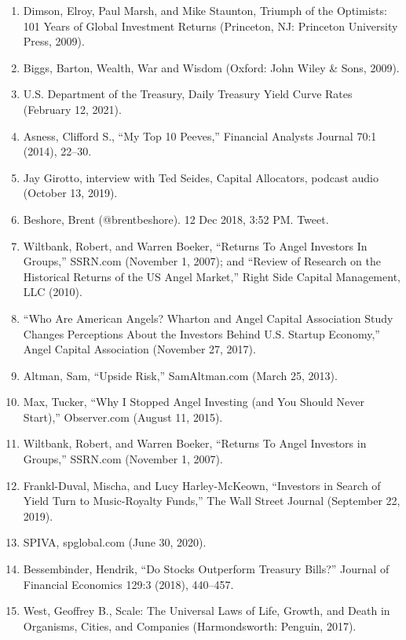 \begin{enumerate}
\item\hypertarget{endnote:66}{} Dimson, Elroy, Paul Marsh, and Mike Staunton, Triumph of the Optimists: 101 Years of Global Investment Returns (Princeton, NJ: Princeton University Press, 2009).
\item\hypertarget{endnote:67}{} Biggs, Barton, Wealth, War and Wisdom (Oxford: John Wiley \& Sons, 2009).
\item\hypertarget{endnote:68}{} U.S. Department of the Treasury, Daily Treasury Yield Curve Rates (February 12, 2021).
\item\hypertarget{endnote:69}{} Asness, Clifford S., “My Top 10 Peeves,” Financial Analysts Journal 70:1 (2014), 22–30.
\item\hypertarget{endnote:70}{} Jay Girotto, interview with Ted Seides, Capital Allocators, podcast audio (October 13, 2019).
\item\hypertarget{endnote:71}{} Beshore, Brent (@brentbeshore). 12 Dec 2018, 3:52 PM. Tweet.
\item\hypertarget{endnote:72}{} Wiltbank, Robert, and Warren Boeker, “Returns To Angel Investors In Groups,” SSRN.com (November 1, 2007); and “Review of Research on the Historical Returns of the US Angel Market,” Right Side Capital Management, LLC (2010).
\item\hypertarget{endnote:73}{} “Who Are American Angels? Wharton and Angel Capital Association Study Changes Perceptions About the Investors Behind U.S. Startup Economy,” Angel Capital Association (November 27, 2017).
\item\hypertarget{endnote:74}{} Altman, Sam, “Upside Risk,” SamAltman.com (March 25, 2013).
\item\hypertarget{endnote:75}{} Max, Tucker, “Why I Stopped Angel Investing (and You Should Never Start),” Observer.com (August 11, 2015).
\item\hypertarget{endnote:76}{} Wiltbank, Robert, and Warren Boeker, “Returns To Angel Investors in Groups,” SSRN.com (November 1, 2007).
\item\hypertarget{endnote:77}{} Frankl-Duval, Mischa, and Lucy Harley-McKeown, “Investors in Search of Yield Turn to Music-Royalty Funds,” The Wall Street Journal (September 22, 2019).
\item\hypertarget{endnote:78}{} SPIVA, spglobal.com (June 30, 2020).
\item\hypertarget{endnote:79}{} Bessembinder, Hendrik, “Do Stocks Outperform Treasury Bills?” Journal of Financial Economics 129:3 (2018), 440–457.
\item\hypertarget{endnote:80}{} West, Geoffrey B., Scale: The Universal Laws of Life, Growth, and Death in Organisms, Cities, and Companies (Harmondsworth: Penguin, 2017).

\end{enumerate}
